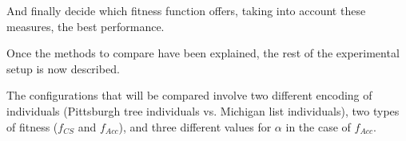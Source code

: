 \documentclass[runningheads]{llncs}
\begin{document}
And finally decide which fitness function offers, taking into account these measures, the best performance. 



\label{sec:experiments}

Once the methods to compare have been explained, the rest of the experimental setup is now described.

The configurations that will be compared involve two different encoding of individuals (Pittsburgh tree individuals vs. Michigan list individuals), two types of fitness ($f_{CS}$ and $f_{Acc}$), and three different values for $\alpha$ in the case of $f_{Acc}$.
\end{document}
